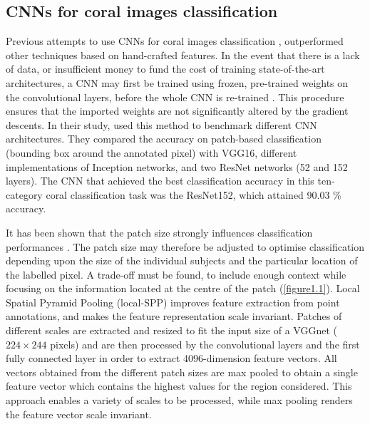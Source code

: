 \subsection{CNNs for coral images classification}\label{chapitre1_2.2}
Previous attempts to use CNNs for coral images classification \citep{beijbom_improving_2016, king_comparison_2018, mahmood_deep_2017, mahmood_coral_2016}, outperformed other techniques based on hand-crafted features. In the event that there is a lack of data, or insufficient money to fund the cost of training state-of-the-art architectures, a CNN may first be trained using frozen, pre-trained weights on the convolutional layers, before the whole CNN is re-trained \citep{king_comparison_2018}. This procedure ensures that the imported weights are not significantly altered by the gradient descents. In their study, \citet{king_comparison_2018} used this method to benchmark different CNN architectures. They compared the accuracy on patch-based classification (bounding box around the annotated pixel) with VGG16, different implementations of Inception networks, and two ResNet networks (52 and 152 layers). The CNN that achieved the best classification accuracy in this ten-category coral classification task was the ResNet152, which attained 90.03 \% accuracy.

It has been shown that the patch size strongly influences classification performances \citep{beijbom_automated_2012}. The patch size may therefore be adjusted to optimise classification depending upon the size of the individual subjects and the particular location of the labelled pixel. A trade-off must be found, to include enough context while focusing on the information located at the centre of the patch \citep{beijbom_automated_2012} (\autoref{figure1.1}). Local Spatial Pyramid Pooling (local-SPP) \citep{mahmood_coral_2016} improves feature extraction from point annotations, and makes the feature representation scale invariant. Patches of different scales are extracted and resized to fit the input size of a VGGnet (\(224 \times 244\) pixels) and are then processed by the convolutional layers and the first fully connected layer in order to extract 4096-dimension feature vectors. All vectors obtained from the different patch sizes are max pooled to obtain a single feature vector which contains the highest values for the region considered. This approach enables a variety of scales to be processed, while max pooling renders the feature vector scale invariant.

